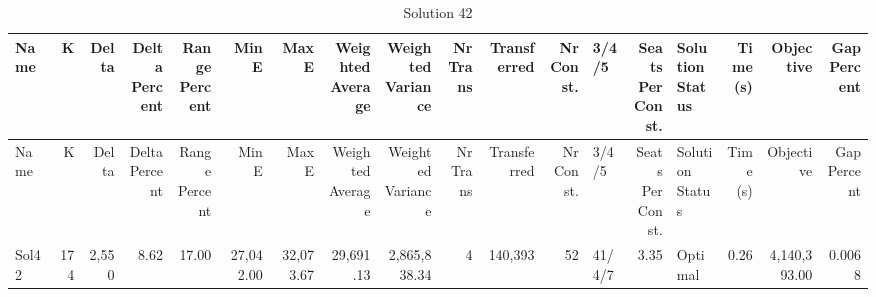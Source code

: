\documentclass[a4paper]{article}
\begin{document}
{\scriptsize
\begin{longtable}{lrrrrrrrrrrrlrlrrr}
\caption{Solution 42}
\\ \toprule
Name &K &Delta &\shortstack{Delta\\Percent} &\shortstack{Range\\Percent} &Min E &Max E &\shortstack{Weighted\\Average} &\shortstack{Weighted\\Variance} &\shortstack{Nr\\Trans} &Transferred &\shortstack{Nr\\Const.} &3/4/5 &\shortstack{Seats\\Per\\Const.} &\shortstack{Solution\\Status} &\shortstack{Time\\(s)} &Objective &\shortstack{Gap\\Percent} \\ \midrule
\endfirsthead
\toprule
Name &K &Delta &\shortstack{Delta\\Percent} &\shortstack{Range\\Percent} &Min E &Max E &\shortstack{Weighted\\Average} &\shortstack{Weighted\\Variance} &\shortstack{Nr\\Trans} &Transferred &\shortstack{Nr\\Const.} &3/4/5 &\shortstack{Seats\\Per\\Const.} &\shortstack{Solution\\Status} &\shortstack{Time\\(s)} &Objective &\shortstack{Gap\\Percent} \\ \midrule
\endhead
\bottomrule
\endfoot
Sol42&174&2,550& 8.62&17.00&27,042.00&32,073.67&29,691.13&2,865,838.34&4&140,393&52&41/4/7& 3.35&Optimal& 0.26&4,140,393.00&0.0068\\ 
\end{longtable}

}
\end{document}
